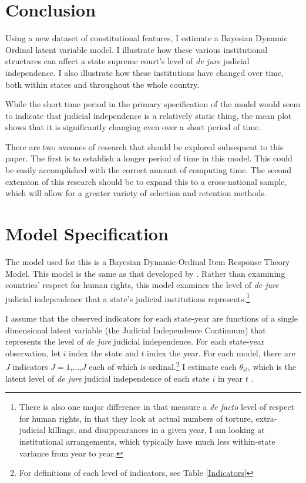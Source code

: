 \documentclass[12pt]{article}
\begin{document}
\section{Conclusion}
Using a new dataset of constitutional features, I estimate a Bayesian Dynamic Ordinal latent variable model.  I illustrate how these various institutional structures can affect a state supreme court's level of \textit{de jure} judicial independence.  I also illustrate how these institutions have changed over time, both within states and throughout the whole country.  

While the short time period in the primary specification of the model would seem to indicate that judicial independence is a relatively static thing, the mean plot shows that it is significantly changing even over a short period of time. 

There are two avenues of research that should be explored subsequent to this paper.  The first is to establish a longer period of time in this model.  This could be easily accomplished with the correct amount of computing time.  The second extension of this research should be to expand this to a cross-national sample, which will allow for a greater variety of selection and retention methods.

\singlespacing



\appendix
\section{Model Specification}\label{ModelApp}
The model used for this is a Bayesian Dynamic-Ordinal Item Response Theory Model.  This model is the same as that developed by \citet{Schnakenberg2014}.  Rather than examining countries' respect for human rights, this model examines the level of \textit{de jure} judicial independence that a state's judicial institutions represents.\footnote{There is also one major difference in that \citeauthor{Schnakenberg2014} measure a \textit{de facto} level of respect for human rights, in that they look at actual numbers of torture, extra-judicial killings, and disappearances in a given year, I am looking at institutional arrangements, which typically have much less within-state variance from year to year.}	

I assume that the observed indicators for each state-year are functions of a single dimensional latent variable (the Judicial Independence Continuum) that represents the level of \textit{de jure} judicial independence.  For each state-year observation, let $i$ index the state and $t$ index the year.  For each model, there are $J$ indicators $J=1$,...,$J$ each of which is ordinal.\footnote{For definitions of each level of indicators, see Table \ref{Indicators}} I estimate each $\theta_{it}$, which is the latent level of \textit{de jure} judicial independence of each state $i$ in year $t$ \citep[7]{Schnakenberg2014}.
\end{document}
